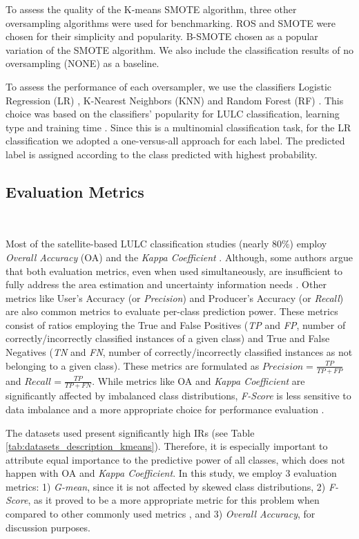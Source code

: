 To assess the quality of the K-means SMOTE algorithm,
three other oversampling algorithms were used for benchmarking. ROS and SMOTE
were chosen for their simplicity and popularity. B-SMOTE chosen as a popular
variation of the SMOTE algorithm. We also include the classification results
of no oversampling (NONE) as a baseline.

To assess the performance of each oversampler, we use the classifiers Logistic
Regression (LR) \cite{Nelder1972}, K-Nearest Neighbors (KNN)
\cite{Cover1967} and Random Forest (RF)
\cite{Liaw2002}. This choice was based on the classifiers' popularity for LULC
classification, learning type and training time
\cite{Maxwell2018,Gavade2019}. Since this is a multinomial classification
task, for the LR classification we adopted a one-versus-all approach for each
label. The predicted label is assigned according to the class predicted with
highest probability.

\subsection{Evaluation Metrics}~\label{sec:evaluation-metrics-kmeans}

Most of the satellite-based LULC classification studies (nearly 80\%) employ
\textit{Overall Accuracy} (OA) and the \textit{Kappa Coefficient}
\cite{Gavade2019}. Although, some authors argue that both evaluation metrics,
even when used simultaneously, are insufficient to fully address the area
estimation and uncertainty information needs \cite{Olofsson2013,Pontius2011}.
Other metrics like User's Accuracy (or \textit{Precision}) and Producer's
Accuracy (or \textit{Recall}) are also common metrics to evaluate per-class
prediction power. These metrics consist of ratios employing the True and False
Positives (\textit{TP} and \textit{FP}, number of correctly/incorrectly
classified instances of a given class) and True and
False Negatives (\textit{TN} and \textit{FN}, number of correctly/incorrectly
classified instances as not belonging to a given
class). These metrics are formulated as $Precision = \frac{TP}{TP+FP}$ and
$Recall = \frac{TP}{TP+FN}$. While metrics like OA and \textit{Kappa
Coefficient} are significantly affected by imbalanced class distributions,
\textit{F-Score} is less sensitive to data imbalance and a more appropriate
choice for performance evaluation \cite{Jeni2013}.

The datasets used present significantly high IRs (see Table
\ref{tab:datasets_description_kmeans}). Therefore, it is especially important to
attribute equal importance to the predictive power of all classes, which does
not happen with OA and \textit{Kappa Coefficient}. In this study, we employ 3
evaluation metrics: 1) \textit{G-mean}, since it is not affected by skewed class
distributions, 2) \textit{F-Score}, as it proved to be a more appropriate metric
for this problem when compared to other commonly used metrics \cite{Jeni2013},
and 3) \textit{Overall Accuracy}, for discussion purposes.

